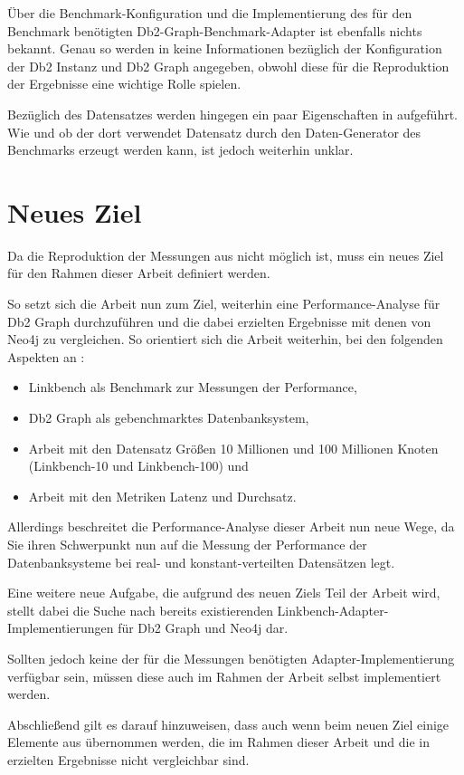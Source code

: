 Über die Benchmark-Konfiguration und die Implementierung des für den Benchmark benötigten Db2-Graph-Benchmark-Adapter ist ebenfalls nichts bekannt. Genau so werden in \cite{sigmod_tian} keine Informationen bezüglich der  Konfiguration der Db2 Instanz und Db2 Graph angegeben, obwohl diese für die Reproduktion der Ergebnisse eine wichtige Rolle spielen. 

Bezüglich des Datensatzes werden hingegen ein paar Eigenschaften in \cite{sigmod_tian} aufgeführt. Wie und ob der dort verwendet Datensatz durch den Daten-Generator des Benchmarks erzeugt werden kann, ist jedoch weiterhin unklar.

\section{Neues Ziel}
Da die Reproduktion der Messungen aus \cite{sigmod_tian} nicht möglich ist, muss ein neues Ziel für den Rahmen dieser Arbeit definiert werden. 

So setzt sich die Arbeit nun zum Ziel, weiterhin eine Performance-Analyse für Db2 Graph durchzuführen und die dabei erzielten Ergebnisse mit denen von Neo4j zu vergleichen. So orientiert sich die Arbeit weiterhin, bei den folgenden Aspekten an \cite{sigmod_tian}:
\begin{itemize}
    \item Linkbench als Benchmark zur Messungen der Performance,
    \item Db2 Graph als gebenchmarktes Datenbanksystem,
    \item Arbeit mit den Datensatz Größen 10 Millionen und 100 Millionen Knoten (Linkbench-10 und Linkbench-100) und
    \item Arbeit mit den Metriken Latenz und Durchsatz.  
\end{itemize}
Allerdings beschreitet die Performance-Analyse dieser Arbeit nun neue Wege, da Sie ihren Schwerpunkt nun auf die Messung der Performance der Datenbanksysteme bei real- und konstant-verteilten Datensätzen legt. 

Eine weitere neue Aufgabe, die aufgrund des neuen Ziels Teil der Arbeit wird, stellt dabei die Suche nach bereits existierenden Linkbench-Adapter-Implementierungen für Db2 Graph und Neo4j dar. 

Sollten jedoch keine der für die Messungen benötigten Adapter-Implementierung verfügbar sein, müssen diese auch im Rahmen der Arbeit selbst implementiert werden. 

Abschließend gilt es darauf hinzuweisen, dass auch wenn beim neuen Ziel einige Elemente aus \cite{sigmod_tian} übernommen werden, die im Rahmen dieser Arbeit und die in \cite{sigmod_tian} erzielten Ergebnisse nicht vergleichbar sind.

